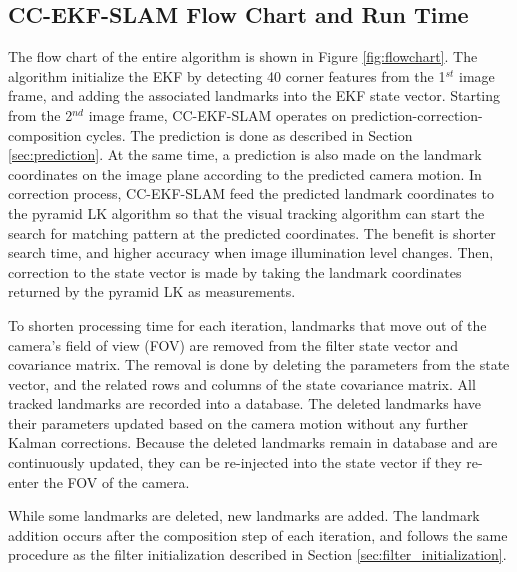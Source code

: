 \subsection{CC-EKF-SLAM Flow Chart and Run Time}
The flow chart of the entire algorithm is shown in Figure
\ref{fig:flowchart}. The algorithm initialize the EKF by detecting 40
corner features from the 1$^{st}$ image frame, and adding the
associated landmarks into the EKF state vector. Starting from the
2$^{nd}$ image frame, CC-EKF-SLAM operates on
prediction-correction-composition cycles. The prediction is done as
described in Section \ref{sec:prediction}. At the same time, a
prediction is also made on the landmark coordinates on the image plane
according to the predicted camera motion. In correction process,
CC-EKF-SLAM feed the predicted landmark coordinates to the pyramid LK
algorithm so that the visual tracking algorithm can start the search
for matching pattern at the predicted coordinates. The benefit is
shorter search time, and higher accuracy when image illumination level
changes. Then, correction to the state vector is made by taking the
landmark coordinates returned by the pyramid LK as measurements.

To shorten processing time for each iteration, landmarks that move
out of the camera's field of view (FOV) are removed from the filter
state vector and covariance matrix. The removal is done by deleting
the parameters from the state vector, and the related rows and columns
of the state covariance matrix. All tracked landmarks are recorded
into a database. The deleted landmarks have their parameters updated
based on the camera motion without any further Kalman corrections.
Because the deleted landmarks remain in database and are continuously
updated, they can be re-injected into the state vector if they
re-enter the FOV of the camera.

While some landmarks are deleted, new landmarks are added. The
landmark addition occurs after the composition step of each
iteration, and follows the same procedure as the filter
initialization described in Section \ref{sec:filter_initialization}.



